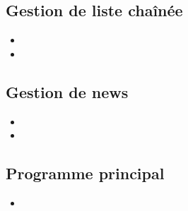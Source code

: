 \subsection{Gestion de liste chaînée}
  \begin{itemize}
	\item {}
	\item {}
  \end{itemize}

\subsection{Gestion de news}
  \begin{itemize}
    \item {}
    \item {}
  \end{itemize}
\subsection{Programme principal}
  \begin{itemize}
    \item {}
  \end{itemize}